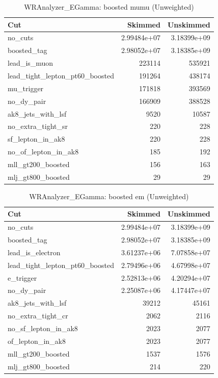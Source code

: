 \documentclass{article}
\begin{document}
\begin{table}[htbp]
\centering
\caption{WRAnalyzer\_EGamma: boosted mumu (Unweighted)}
\begin{tabular}{lrr}
\hline
Cut & Skimmed & Unskimmed \\
\hline
no\_cuts & 2.99484e+07 & 3.18399e+09 \\
boosted\_tag & 2.98052e+07 & 3.18385e+09 \\
lead\_is\_muon & 223114 & 535921 \\
lead\_tight\_lepton\_pt60\_boosted & 191264 & 438174 \\
mu\_trigger & 171818 & 393569 \\
no\_dy\_pair & 166909 & 388528 \\
ak8\_jets\_with\_lsf & 9520 & 10587 \\
no\_extra\_tight\_sr & 220 & 228 \\
sf\_lepton\_in\_ak8 & 220 & 228 \\
no\_of\_lepton\_in\_ak8 & 185 & 192 \\
mll\_gt200\_boosted & 156 & 163 \\
mlj\_gt800\_boosted & 29 & 29 \\
\hline
\end{tabular}
\end{table}

\begin{table}[htbp]
\centering
\caption{WRAnalyzer\_EGamma: boosted em (Unweighted)}
\begin{tabular}{lrr}
\hline
Cut & Skimmed & Unskimmed \\
\hline
no\_cuts & 2.99484e+07 & 3.18399e+09 \\
boosted\_tag & 2.98052e+07 & 3.18385e+09 \\
lead\_is\_electron & 3.61237e+06 & 7.07858e+07 \\
lead\_tight\_lepton\_pt60\_boosted & 2.79496e+06 & 4.67998e+07 \\
e\_trigger & 2.52813e+06 & 4.20294e+07 \\
no\_dy\_pair & 2.25087e+06 & 4.17447e+07 \\
ak8\_jets\_with\_lsf & 39212 & 45161 \\
no\_extra\_tight\_cr & 2062 & 2116 \\
no\_sf\_lepton\_in\_ak8 & 2023 & 2077 \\
of\_lepton\_in\_ak8 & 2023 & 2077 \\
mll\_gt200\_boosted & 1537 & 1576 \\
mlj\_gt800\_boosted & 214 & 220 \\
\hline
\end{tabular}
\end{table}
\end{document}
